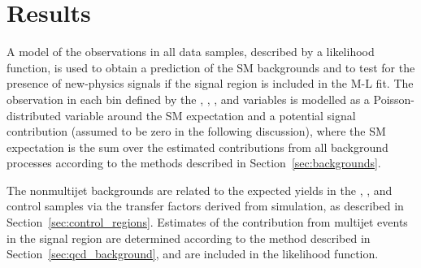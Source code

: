 \section{Results}
\label{sec:result}

A model of the observations in all data samples, described by a
likelihood function, is used to obtain a prediction of the SM
backgrounds and to test for the presence of new-physics signals if
the signal region is included in the M-L fit. The
observation in each bin defined by the \njet, \nb, \scalht, and
\HTmiss variables is modelled as a Poisson-distributed variable around
the SM expectation and a potential signal contribution (assumed to be
zero in the following discussion), where the SM expectation is the sum
over the estimated contributions from all background processes
according to the methods described in Section~\ref{sec:backgrounds}.

The nonmultijet backgrounds 
are related to the expected yields in the \mj, \mmj, and \gj control
samples via the transfer factors derived from simulation, as described
in Section~\ref{sec:control_regions}.
Estimates of the contribution from multijet events in the signal
region are determined according to the method described in
Section~\ref{sec:qcd_background}, and are included in the likelihood
function.


